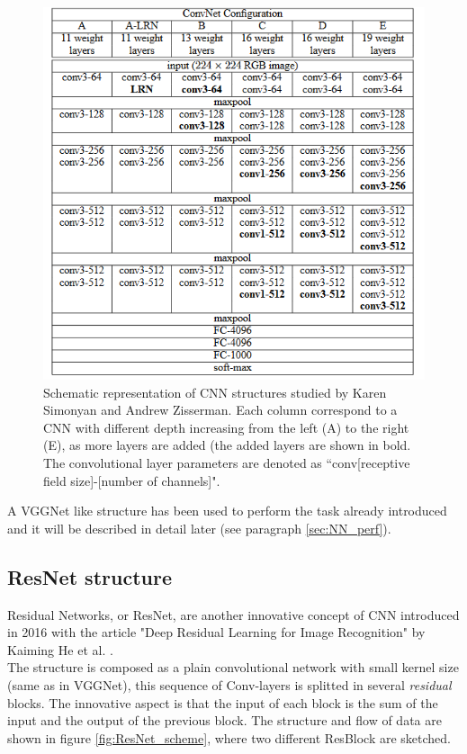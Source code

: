 \begin{figure}
	\centering
	\includegraphics[width=.8\textwidth]{IMG/Cap6/VGG_art.png}
	\caption{Schematic representation of CNN structures studied by Karen Simonyan and Andrew Zisserman. Each column correspond to a CNN with different depth increasing from the left (A) to the right (E), as more layers are added (the added layers are shown in bold. The convolutional layer parameters are denoted as “conv[receptive field size]-[number of channels]".}
	\label{fig:VGG_table}
\end{figure}

A VGGNet like structure has been used to perform the task already introduced and it will be described in detail later (see paragraph \ref{sec:NN_perf}).

\subsection*{ResNet structure}
Residual Networks, or ResNet, are another innovative concept of CNN introduced in 2016 with the article "Deep Residual Learning for Image Recognition" by Kaiming He et al. \cite{ResNetArt}.\\
The structure is composed as a plain convolutional network with small kernel size (same as in VGGNet), this sequence of Conv-layers is splitted in several \textit{residual} blocks. The innovative aspect is that the input of each block is the sum of the input and the output of the previous block. The structure and flow of data are shown in figure \ref{fig:ResNet_scheme}, where two different ResBlock are sketched.\\

